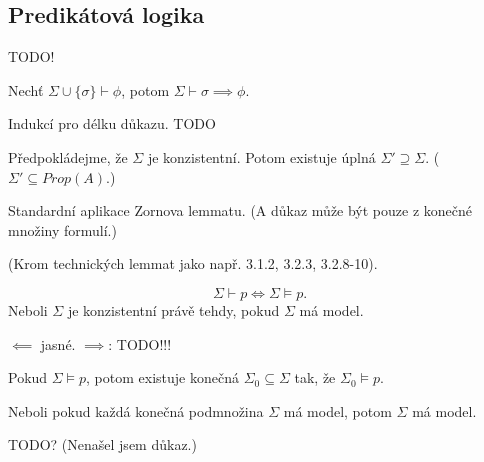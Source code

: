 \documentclass[12pt]{article}                   %
\begin{document}
    \subsection{Predikátová logika}
        \begin{tvrzeni}
            TODO!
        \end{tvrzeni}

        \begin{lemma}[O dedukci]
            Nechť $\Sigma \cup \{\sigma\} \vdash \phi$, potom $\Sigma \vdash \sigma \implies \phi$.

            \begin{dukazin}
                Indukcí pro délku důkazu. TODO
            \end{dukazin}
        \end{lemma}

        \begin{lemma}[Lindenbaum]
            Předpokládejme, že $\Sigma$ je konzistentní. Potom existuje úplná $\Sigma' \supseteq \Sigma$. ($\Sigma' \subseteq Prop(A)$.)

            \begin{dukazin}
                Standardní aplikace Zornova lemmatu. (A důkaz může být pouze z konečné množiny formulí.)
            \end{dukazin}
        \end{lemma}

        \begin{veta}[O úplnosti]
            (Krom technických lemmat jako např. 3.1.2, 3.2.3, 3.2.8-10).

            $$ \Sigma \vdash p \Leftrightarrow \Sigma \models p. $$
            Neboli $\Sigma$ je konzistentní právě tehdy, pokud $\Sigma$ má model.

            \begin{dukazin}
                $\impliedby$ jasné. $\implies$: TODO!!! 
            \end{dukazin}
        \end{veta}

        \begin{veta}[O kompaktnosti]
            Pokud $\Sigma \models p$, potom existuje konečná $\Sigma_0 \subseteq \Sigma$ tak, že $\Sigma_0 \models p$.

            Neboli pokud každá konečná podmnožina $\Sigma$ má model, potom $\Sigma$ má model.

            \begin{dukazin}
                TODO? (Nenašel jsem důkaz.)
            \end{dukazin}
        \end{veta}
\end{document}
